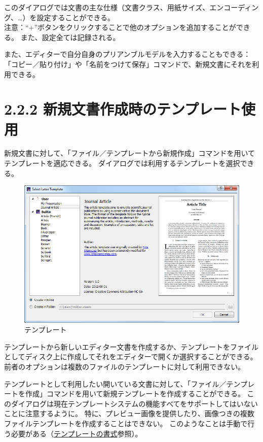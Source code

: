 \documentclass[]{book}
\makeatletter
\def\maxwidth{\ifdim\Gin@nat@width>\linewidth\linewidth
\else\Gin@nat@width\fi}
\let\Oldincludegraphics\includegraphics
\renewcommand{\includegraphics}[1]{\Oldincludegraphics[width=\maxwidth]{#1}}
\makeatother
\begin{document}
このダイアログでは文書の主な仕様（文書クラス、用紙サイズ、エンコーディング、\ldots{}）を設定することができる。\\
注意：``+''ボタンをクリックすることで他のオプションを追加することができる。
また、設定全ては記録される。

また、エディターで自分自身のプリアンブルモデルを入力することもできる：「コピー／貼り付け」や「名前をつけて保存」コマンドで、新規文書にそれを利用できる。

\section{2.2.2 新規文書作成時のテンプレート使用}

新規文書に対して、「ファイル／テンプレートから新規作成」コマンドを用いてテンプレートを適応できる。
ダイアログでは利用するテンプレートを選択できる。

\begin{figure}[htbp]
\centering
\includegraphics{template.png}
\caption{テンプレート}
\end{figure}

テンプレートから新しいエディター文書を作成するか、テンプレートをファイルとしてディスク上に作成してそれをエディターで開くか選択することができる。
前者のオプションは複数のファイルのテンプレートに対して利用できない。

テンプレートとして利用したい開いている文書に対して、「ファイル／テンプレートを作成」コマンドを用いて新規テンプレートを作成することができる。
このダイアログは現在テンプレートシステムの機能すべてをサポートしてはいないことに注意するように。
特に、プレビュー画像を提供したり、画像つきの複数ファイルテンプレートを作成することはできない。
このようなことは手動で行う必要がある（\hyperref[SECTION12aa]{テンプレートの書式}参照）。
\end{document}
